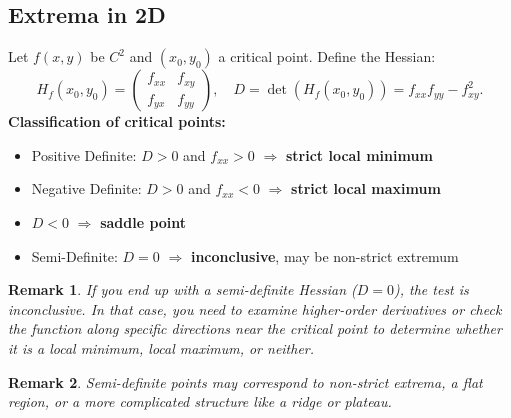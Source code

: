\documentclass{article}
\newtheorem{remark}{Remark}
\begin{document}
\subsection{Extrema in 2D}
Let $f(x,y)$ be $C^2$ and $(x_0,y_0)$ a critical point. Define the Hessian:
\[H_f(x_0,y_0) = \begin{pmatrix} f_{xx} & f_{xy} \\ f_{yx} & f_{yy} \end{pmatrix}, \quad D = \det(H_f(x_0,y_0)) = f_{xx}f_{yy} - f_{xy}^2.\]
\textbf{Classification of critical points:}
\begin{itemize}
    \item Positive Definite: $D>0$ and $f_{xx}>0$ $\Rightarrow$ \textbf{strict local minimum}
    \item Negative Definite: $D>0$ and $f_{xx}<0$ $\Rightarrow$ \textbf{strict local maximum}
    \item $D<0$ $\Rightarrow$ \textbf{saddle point}
    \item Semi-Definite: $D=0$ $\Rightarrow$ \textbf{inconclusive}, may be non-strict extremum
\end{itemize}
\begin{remark}
    If you end up with a semi-definite Hessian ($D=0$), the test is inconclusive. In that case, you need to examine higher-order derivatives or check the function along specific directions near the critical point to determine whether it is a local minimum, local maximum, or neither. 
\end{remark}
\begin{remark}
    Semi-definite points may correspond to non-strict extrema, a flat region, or a more complicated structure like a ridge or plateau.
\end{remark}
\end{document}
